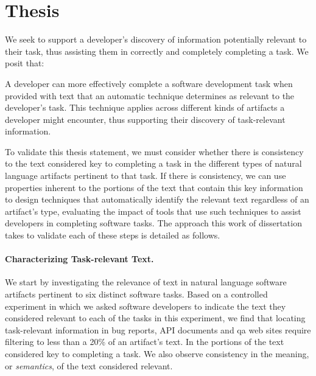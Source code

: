 

\section{Thesis}
\label{cp1:thesis}



We seek to support a developer's discovery of information potentially relevant to their task, thus assisting
them in correctly and completely completing a task. 
We posit that:

\medskip
\begin{bluequote}
    A developer can more effectively complete a software development task when provided
    with text that an automatic technique determines as relevant to the developer's task.
    This technique applies across different kinds
    of artifacts a developer might encounter, thus supporting their discovery of task-relevant information.
\end{bluequote}





To validate this thesis statement, 
we must consider whether there is consistency to 
the text 
considered key to completing a task
in the different types of natural language artifacts pertinent to that task.
If there is consistency, we can use properties inherent 
to the portions of the text that contain this key information 
to design techniques that automatically identify the relevant text
regardless of an artifact's type, evaluating the impact of tools that use such techniques to assist developers in completing software tasks. 
The approach this work of dissertation takes to validate each of these steps is detailed as follows.



\paragraph{\textbf{Characterizing Task-relevant Text.}} 


We start by investigating the relevance of text in natural language software artifacts
pertinent to six distinct software tasks.
Based on a controlled experiment in which we asked software developers to 
indicate the text they considered relevant to each of the tasks in this experiment,
we find that 
locating task-relevant information in bug
reports, API documents and \acf{qa} web sites require filtering
to less than a 20\% of an artifact's text.
In 
the portions of the text 
considered key to completing a task. We also 
observe consistency in the meaning, or \textit{semantics}, of the
 text considered relevant.


